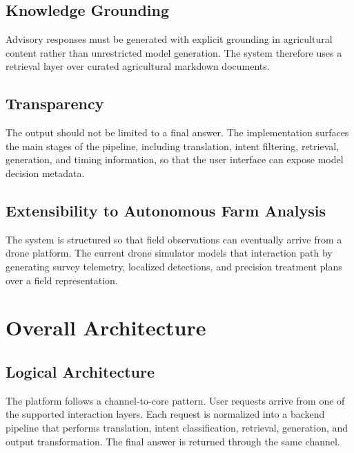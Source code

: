 \documentclass[11pt,a4paper]{article}
\begin{document}
\subsection{Knowledge Grounding}

Advisory responses must be generated with explicit grounding in agricultural content rather than unrestricted model generation. The system therefore uses a retrieval layer over curated agricultural markdown documents.

\subsection{Transparency}

The output should not be limited to a final answer. The implementation surfaces the main stages of the pipeline, including translation, intent filtering, retrieval, generation, and timing information, so that the user interface can expose model decision metadata.

\subsection{Extensibility to Autonomous Farm Analysis}

The system is structured so that field observations can eventually arrive from a drone platform. The current drone simulator models that interaction path by generating survey telemetry, localized detections, and precision treatment plans over a field representation.

\section{Overall Architecture}

\subsection{Logical Architecture}

The platform follows a channel-to-core pattern. User requests arrive from one of the supported interaction layers. Each request is normalized into a backend pipeline that performs translation, intent classification, retrieval, generation, and output transformation. The final answer is returned through the same channel.
\end{document}
